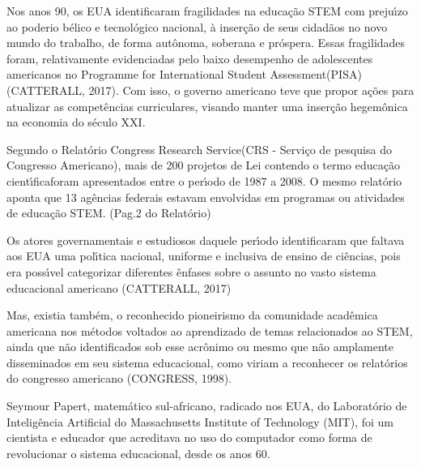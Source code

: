 \documentclass[
12pt,		%
openright,	%
twoside,  %
a4paper,			%
chapter=TITLE,		%
english,			%
french,				%
spanish,			%
brazil				%
]{USPSC-classe/USPSC}
\begin{document}
Nos anos 90, os EUA identificaram fragilidades na educa\c{c}\~ao STEM com preju\'{\i}zo ao \textquotedbl poderio b\'elico e tecnol\'ogico nacional\textquotedbl , \`a inser\c{c}\~ao de seus cidad\~aos no novo mundo do trabalho, de forma aut\^onoma, soberana  e pr\'ospera. Essas fragilidades foram, relativamente evidenciadas pelo baixo desempenho de adolescentes americanos no \textquotedbl Programme for International Student Assessment\textquotedbl  (PISA)  (CATTERALL, 2017). Com isso, o governo americano teve que propor a\c{c}\~oes para atualizar as compet\^encias curriculares, visando manter uma inser\c{c}\~ao hegem\^onica na economia do s\'eculo XXI.








Segundo o Relat\'orio \textquotedbl Congress Research Service\textquotedbl  (CRS - Servi\c{c}o de pesquisa do Congresso Americano), mais de 200 projetos de Lei contendo o termo \textquotedbl educa\c{c}\~ao cient\'{\i}fica\textquotedbl  foram apresentados entre o per\'{\i}odo de 1987 a 2008. O mesmo relat\'orio aponta que 13 ag\^encias federais estavam envolvidas em programas ou atividades de educa\c{c}\~ao \textquotedbl STEM\textquotedbl . (Pag.2 do Relat\'orio)








Os atores governamentais e estudiosos daquele per\'{\i}odo identificaram que faltava aos EUA uma pol\'{\i}tica nacional, uniforme e inclusiva de ensino de ci\^encias, pois era poss\'{\i}vel categorizar diferentes \^enfases sobre o assunto no vasto sistema educacional americano  (CATTERALL, 2017)








Mas, existia tamb\'em, o reconhecido pioneirismo da comunidade acad\^emica americana nos m\'etodos voltados ao aprendizado de temas relacionados ao STEM, ainda que n\~ao identificados sob esse acr\^onimo ou mesmo que n\~ao amplamente disseminados em seu sistema educacional, como viriam a reconhecer os relat\'orios do congresso americano  (CONGRESS, 1998).








Seymour Papert, matem\'atico sul-africano, radicado nos EUA, do Laborat\'orio de Intelig\^encia Artificial do Massachusetts Institute of Technology (MIT), foi um  cientista e educador que acreditava  no  uso do computador como forma de revolucionar o sistema  educacional,  desde os anos 60.
\end{document}

